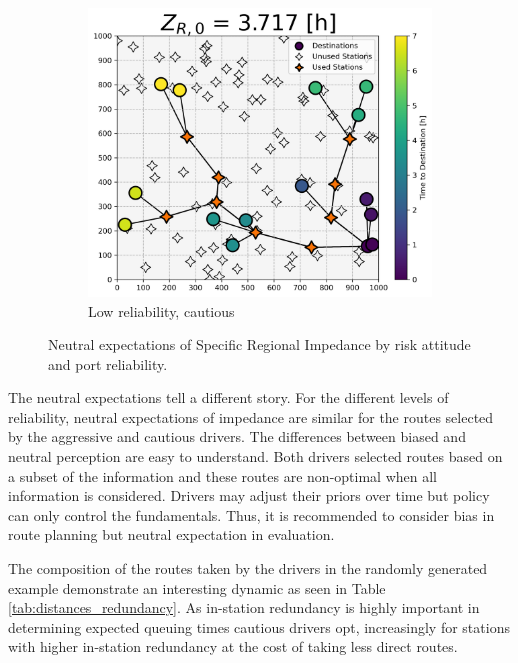 \documentclass[11pt]{article}
\begin{document}
\begin{multicols}{2}
\begin{figure}[H]
\begin{subfigure}[t]{.5\linewidth}
		\centering\captionsetup{width = .8\linewidth}
		\includegraphics[width = \linewidth]{figs/random_example_low_reliability_cautious_actual.png}
		\caption{Low reliability, cautious}
	\end{subfigure}
	\caption{Neutral expectations of Specific Regional Impedance by risk attitude and port reliability.}
	\label{fig:perceived_srta_random_actual}
\end{figure}

The neutral expectations tell a different story. For the different levels of reliability, neutral expectations of impedance are similar for the routes selected by the aggressive and cautious drivers. The differences between biased and neutral perception are easy to understand. Both drivers selected routes based on a subset of the information and these routes are non-optimal when all information is considered. Drivers may adjust their priors over time but policy can only control the fundamentals. Thus, it is recommended to consider bias in route planning but neutral expectation in evaluation.

The composition of the routes taken by the drivers in the randomly generated example demonstrate an interesting dynamic as seen in Table \ref{tab:distances_redundancy}. As in-station redundancy is highly important in determining expected queuing times cautious drivers opt, increasingly for stations with higher in-station redundancy at the cost of taking less direct routes.


\end{multicols}
\end{document}
